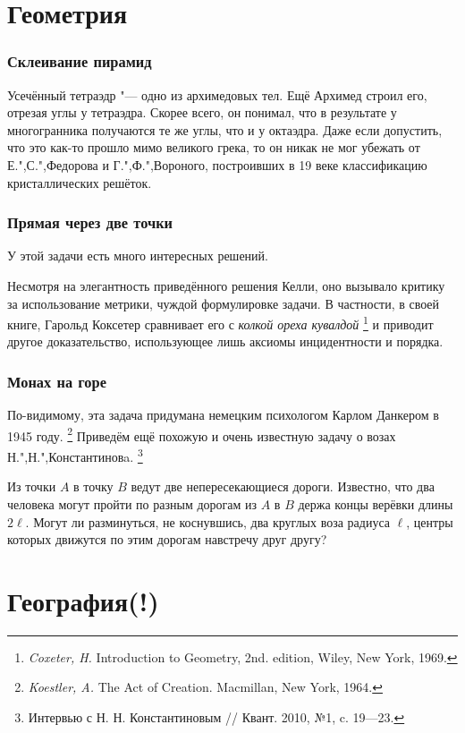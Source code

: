 \documentclass[twoside]{book}
\begin{document}
\section{Геометрия}

\subsubsection*{Склеивание пирамид}
Усечённый тетраэдр "--- одно из архимедовых тел.
Ещё Архимед строил его, отрезая углы у тетраэдра.
Скорее всего, он понимал, что в результате у многогранника получаются те же углы, что и у октаэдра.
Даже если допустить, что это как-то прошло мимо великого грека, то он никак не мог убежать от Е.",С.",Федорова и Г.",Ф.",Вороного, построивших в 19 веке классификацию кристаллических решёток.

\subsubsection{Прямая через две точки}
У этой задачи есть много интересных решений.

Несмотря на элегантность приведённого решения Келли, оно вызывало критику за использование метрики, чуждой формулировке задачи.
В частности, в своей книге, Гарольд  Коксетер сравнивает его с \emph{колкой ореха кувалдой}%
\footnote{\emph{Coxeter, H.} Introduction to Geometry, 2nd. edition, Wiley, New York, 1969.}
и приводит другое доказательство, использующее лишь аксиомы инцидентности и порядка.

\subsubsection{Монах на горе}
По-видимому, эта задача придумана немецким психологом Карлом Данкером в 1945 году.%
\footnote{\emph{Koestler, A.} The Act of Creation. Macmillan, New York, 1964.}
Приведём ещё похожую и очень известную задачу о возах Н.",Н.",Константиновa.
\footnote{Интервью с Н. Н. Константиновым /\!/ Квант. 2010, №1, c. 19---23.}

Из точки $A$ в точку $B$ ведут две непересекающиеся дороги.
Известно, что два человека могут пройти по разным дорогам из $A$ в $B$ держа концы верёвки длины $2\ell$.
Могут ли разминуться, не коснувшись, два круглых воза радиуса $\ell$, центры которых движутся по
этим дорогам навстречу друг другу?

\section{География(!)}
\end{document}

